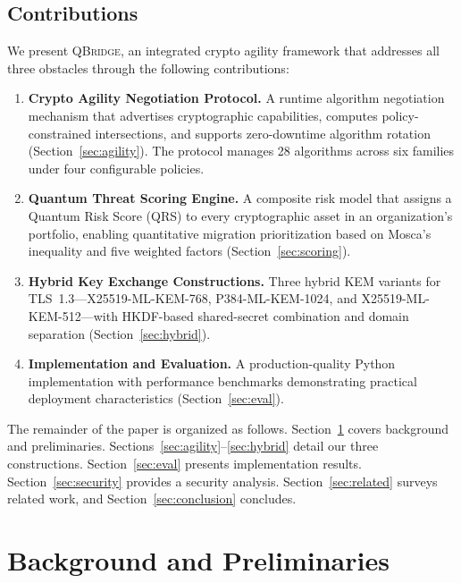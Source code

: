 \documentclass[conference,10pt]{IEEEtran}
\newcommand{\mlkem}{\textrm{ML-KEM}}
\newcommand{\system}{\textsc{QBridge}}
\begin{document}
\subsection{Contributions}

We present \system{}, an integrated crypto agility framework that
addresses all three obstacles through the following contributions:

\begin{enumerate}[leftmargin=*]
\item \textbf{Crypto Agility Negotiation Protocol.}  A runtime
  algorithm negotiation mechanism that advertises cryptographic
  capabilities, computes policy-constrained intersections, and supports
  zero-downtime algorithm rotation (Section~\ref{sec:agility}).
  The protocol manages 28 algorithms across six families under four
  configurable policies.

\item \textbf{Quantum Threat Scoring Engine.}  A composite risk model
  that assigns a Quantum Risk Score (QRS) to every cryptographic
  asset in an organization's portfolio, enabling quantitative migration
  prioritization based on Mosca's inequality and five weighted factors
  (Section~\ref{sec:scoring}).

\item \textbf{Hybrid Key Exchange Constructions.}  Three hybrid KEM
  variants for TLS~1.3---X25519-\mlkem{}-768, P384-\mlkem{}-1024, and
  X25519-\mlkem{}-512---with HKDF-based shared-secret combination
  and domain separation (Section~\ref{sec:hybrid}).

\item \textbf{Implementation and Evaluation.}  A production-quality
  Python implementation with performance benchmarks demonstrating
  practical deployment characteristics (Section~\ref{sec:eval}).
\end{enumerate}

The remainder of the paper is organized as follows.
Section~\ref{sec:background} covers background and preliminaries.
Sections~\ref{sec:agility}--\ref{sec:hybrid} detail our three
constructions. Section~\ref{sec:eval} presents implementation results.
Section~\ref{sec:security} provides a security analysis.
Section~\ref{sec:related} surveys related work, and
Section~\ref{sec:conclusion} concludes.

\section{Background and Preliminaries}\label{sec:background}
\end{document}
